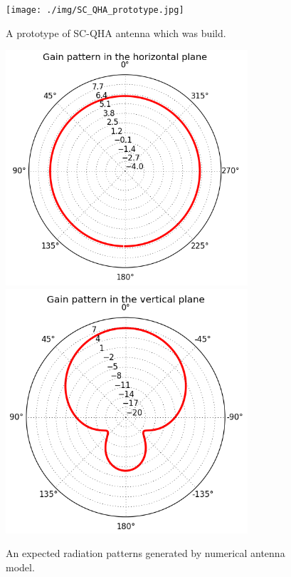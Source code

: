 \documentclass[twoside]{ctuthesis}
\theoremstyle{plain}
\theoremstyle{definition}
\theoremstyle{note}
\begin{document}
\begin{figure}
 \begin{center}
 \texttt{[image: ./img/SC\_QHA\_prototype.jpg]}
 \caption{A prototype of SC-QHA antenna which was build.}
  \label{fig:QHA_antenna} 
 \end{center}
\end{figure}


\begin{figure}
 \begin{center}
 \includegraphics[width=90mm ]{./img/SC_QHA_rp_horizontal.png} 
 \includegraphics[width=90mm ]{./img/SC_QHA_rp_vertical.png}
 \caption{An expected radiation patterns generated by numerical antenna model.}
  \label{fig:QHA_antenna} 
 \end{center}
\end{figure}
\end{document}
